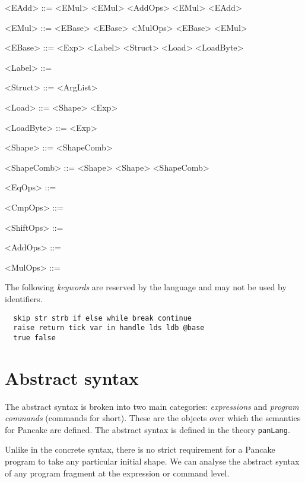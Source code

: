 \documentclass[12pt,a4paper]{report}
\begin{document}
\begin{grammar}
  <EAdd> ::= <EMul>
  \alt <EMul> <AddOps> <EMul> <EAdd>

  <EMul> ::= <EBase>
  \alt <EBase> <MulOps> <EBase> <EMul>

  <EBase> ::= \lit{(} <Exp> \lit{)}
  \alt {}
  \alt {}
  \alt {}
  \alt {}
  \alt <Label>
  \alt <Struct>
  \alt <Load>
  \alt <LoadByte>
  \alt {}


  <Label> ::= \lit{!} 

  <Struct> ::= \lit{\string<} <ArgList> \lit{\string>}

  <Load> ::=  <Shape> <Exp>

  <LoadByte> ::=  <Exp>

  <Shape> ::= 
  \alt \lit{\{} <ShapeComb> \lit{\}}

  <ShapeComb> ::= <Shape>
  \alt <Shape> \lit{,} <ShapeComb>

  <EqOps> ::= \lit{==}
  \alt \lit{\string<\string>}

  <CmpOps> ::= \lit{\string<}
  \alt \lit{\string>=}
  \alt \lit{\string>}
  \alt \lit{\string<=}

  <ShiftOps> ::= \lit{\verb|<<|}
  \alt \lit{>>>}
  \alt \lit{>>}
  \alt \lit{#>>}

  <AddOps> ::= \lit{+}
  \alt \lit{-}

  <MulOps> ::= \lit{*}
\end{grammar}

The following \emph{keywords} are reserved by the language and may not be used by identifiers.

\lstset{language=pancakeConcrete}
\begin{lstlisting}
  skip str strb if else while break continue
  raise return tick var in handle lds ldb @base
  true false
\end{lstlisting}

\section{Abstract syntax}
\label{sec:abstract-syntax}

The abstract syntax is broken into two main categories: \emph{expressions} and \emph{program commands} (commands for short). These are the objects over which the semantics for Pancake are defined. The abstract syntax is defined in the theory \texttt{panLang}.

Unlike in the concrete syntax, there is no strict requirement for a Pancake program to take any particular initial shape. We can analyse the abstract syntax of any program fragment at the expression or command level.
\end{document}
